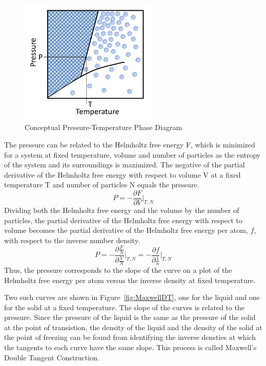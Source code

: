 \documentclass[double,12pt]{beavtex}
\begin{document}
\begin{figure}[h!]
    \centering
    \includegraphics[height=6cm]{P-T_Diagram.png}
    \caption{Conceptual Pressure-Temperature Phase Diagram}
    \label{fig:P-T_Diagram}
  \end{figure}
The pressure can be related to the Helmholtz free energy F, which is minimized 
for a system at fixed temperature, volume and number of particles as the 
entropy of the system and its surroundings is maximized. The negative of 
the partial derivative of the Helmholtz free energy with respect to volume V 
at a fixed temperature T and number of particles N equals the pressure. 
\begin{equation}{P=-\frac{\partial{F}}{\partial{V}}\bigg|_{T,N}}\end{equation}
\noindent Dividing both the Helmholtz free energy and the volume by the 
number of particles, the partial derivative of the Helmholtz free energy 
with respect to volume becomes the partial derivative of the Helmholtz 
free energy per atom, $f$,  with respect to the inverse number density. 
\begin{equation}{P=-\frac{\partial{\frac{F}{N}}}{\partial{\frac{V}{N}}}\bigg|_{T,N} = -\frac{\partial{f}}{\partial{\frac{1}{n}}}\bigg|_{T,N}}\end{equation} Thus, the pressure corresponds to the slope of the curve on a plot of the Helmholtz free energy per atom versus the inverse density at fixed temperature. 

Two such curves are shown in Figure~\ref{fig:MaxwellDT}, one for the liquid 
and one for the solid at a fixed temperature. The slope of the curves is 
related to the pressure. Since the pressure of the 
liquid is the same as the pressure of the solid at the point of transistion, 
the density of the liquid and the density of the solid at the point of 
freezing can be found from identifying the inverse densties at which the 
tangents to each curve have the same slope. This process is called 
Maxwell's Double Tangent Construction. 
\end{document}
